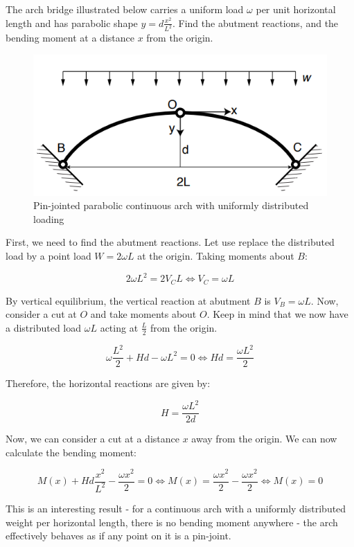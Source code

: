 \documentclass{article}
\begin{document}
\begin{example}
    The arch bridge illustrated below carries a uniform load $\omega$ per unit horizontal length and has parabolic shape $y = d\frac{x^2}{L^2}$. Find the abutment reactions, and the bending moment at a distance $x$ from the origin.

    \begin{figure}[h]
    \centering
    \includegraphics{images/contarch1.png}
    \caption{Pin-jointed parabolic continuous arch with uniformly distributed loading}
    \label{fig:enter-label}
    \end{figure}

    First, we need to find the abutment reactions. Let use replace the distributed load by a point load $W = 2\omega L$ at the origin. Taking moments about $B$:

    \[ 2\omega L^2 = 2V_CL \iff V_C = \omega L \]

    By vertical equilibrium, the vertical reaction at abutment $B$ is $V_B = \omega L$. Now, consider a cut at $O$ and take moments about $O$. Keep in mind that we now have a distributed load $\omega L$ acting at $\frac{L}{2}$ from the origin.

    \[ \omega \frac{L^2}{2} + Hd - \omega L^2 = 0 \iff Hd = \frac{\omega L^2}{2} \]

    Therefore, the horizontal reactions are given by:

    \[ H = \frac{\omega L^2}{2d} \]

    Now, we can consider a cut at a distance $x$ away from the origin. We can now calculate the bending moment:

    \[ M(x) + Hd\frac{x^2}{L^2} - \frac{\omega x^2}{2} = 0 \iff M(x) = \frac{\omega x^2}{2} - \frac{\omega x^2}{2} \iff M(x) = 0 \]
\end{example}

This is an interesting result - for a continuous arch with a uniformly distributed weight per horizontal length, there is no bending moment anywhere - the arch effectively behaves as if any point on it is a pin-joint. 
\end{document}
